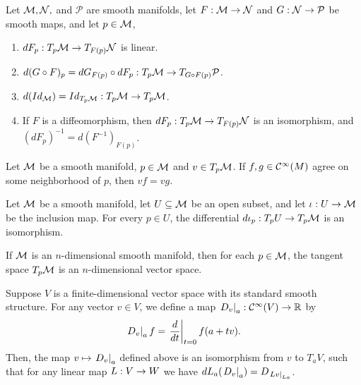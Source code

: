 \documentclass[11pt,a4paper]{article}
\begin{document}
\begin{prop}
Let $\mathcal{M}, \mathcal{N},$ and $\mathcal{P}$ are smooth manifolds, let $F:\mathcal{M}\rightarrow \mathcal{N}$ and $G:\mathcal{N}\rightarrow \mathcal{P}$ be smooth maps, and let $p\in\mathcal{M}$,
\begin{enumerate}
    \item $dF_p:T_p\mathcal{M}\rightarrow T_{F(p)}\mathcal{N}$ is linear.
    \item $d(G\circ F)_p = dG_{F(p)}\circ dF_p:T_p\mathcal{M}\rightarrow T_{G\circ F(p)}\mathcal{P}$.
    \item $d(Id_{\mathcal{M}}) = Id_{T_p\mathcal{M}}:T_p\mathcal{M}\rightarrow T_p\mathcal{M}$.
    \item If $F$ is a diffeomorphism, then $dF_p:T_p\mathcal{M}\rightarrow T_{F(p)}\mathcal{N}$ is an isomorphism, and $(dF_p)^{-1} = d(F^{-1})_{F(p)}$.
\end{enumerate}
\end{prop}

\begin{prop}
Let $\mathcal{M}$ be a smooth manifold, $p \in \mathcal{M}$ and $v\in T_p\mathcal{M}$. If $f, g \in \mathcal{C}^\infty(M)$ agree on some neighborhood of $p$, then $vf = vg$.
\end{prop}

\begin{prop}
Let $\mathcal{M}$ be a smooth manifold, let $U\subseteq \mathcal{M}$ be an open subset, and let $\iota:U\rightarrow \mathcal{M}$ be the inclusion map. For every $p \in U$, the differential $d\iota_p:T_pU\rightarrow T_p\mathcal{M}$ is an isomorphism.
\end{prop}

\begin{prop}
If $\mathcal{M}$ is an $n$-dimensional smooth manifold, then for each $p \in \mathcal{M}$, the tangent space $T_p\mathcal{M}$ is an $n$-dimensional vector space.
\end{prop}

\begin{prop}
Suppose $V$ is a finite-dimensional vector space with its standard smooth structure. For any vector $v\in V$, we define a  map $\left.D_v\right|_{a}:\mathcal{C}^\infty(V)\rightarrow \mathbb{R}$ by 
\begin{equation*}
    \left.D_v\right|_{a} f = \left.\dfrac{d}{dt}\right|_{t=0} f(a+tv).
\end{equation*}
Then, the map $v\mapsto \left.D_v\right|_{a}$ defined above is an isomorphism from $v$ to $T_aV$, such that for any linear map $L:V\rightarrow W$ we have $dL_a(\left.D_v\right|_{a}) = D_{\left.Lv\right|_{La}}$.
\end{prop}
\end{document}

